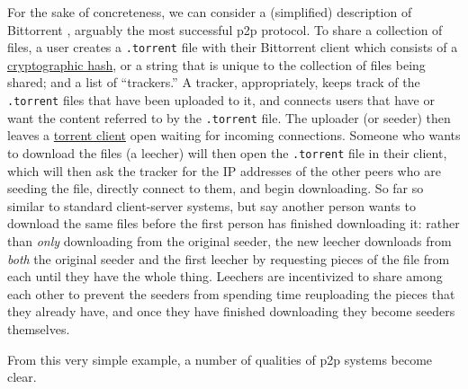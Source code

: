 \documentclass[10pt]{article}
\begin{document}
\begin{multicols}{2}
For the sake of concreteness, we can consider a (simplified) description
of Bittorrent \cite{cohenBitTorrentProtocolSpecification2017} ,
arguably the most successful p2p protocol. To share a collection of
files, a user creates a \texttt{.torrent} file with their Bittorrent
client which consists of a
\href{https://en.wikipedia.org/wiki/Cryptographic_hash_function}{cryptographic
hash}, or a string that is unique to the collection of files being
shared; and a list of ``trackers.'' A tracker, appropriately, keeps
track of the \texttt{.torrent} files that have been uploaded to it, and
connects users that have or want the content referred to by the
\texttt{.torrent} file. The uploader (or seeder) then leaves a
\href{https://en.wikipedia.org/wiki/Glossary_of_BitTorrent_terms\#Client}{torrent
client} open waiting for incoming connections. Someone who wants to
download the files (a leecher) will then open the \texttt{.torrent} file
in their client, which will then ask the tracker for the IP addresses of
the other peers who are seeding the file, directly connect to them, and
begin downloading. So far so similar to standard client-server systems,
but say another person wants to download the same files before the first
person has finished downloading it: rather than \emph{only} downloading
from the original seeder, the new leecher downloads from \emph{both} the
original seeder and the first leecher by requesting pieces of the file
from each until they have the whole thing. Leechers are incentivized to
share among each other to prevent the seeders from spending time
reuploading the pieces that they already have, and once they have
finished downloading they become seeders themselves.

From this very simple example, a number of qualities of p2p systems
become clear.

\begin{itemize}


\end{itemize}
\end{multicols}
\end{document}
